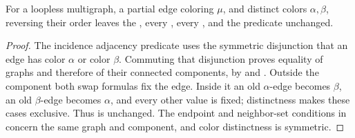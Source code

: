 \begin{lemma}
For a loopless multigraph, a partial edge coloring \(\mu\), and distinct
colors \(\alpha,\beta\), reversing their order leaves the
, every ,
every , and the
 predicate unchanged.
\end{lemma}
\begin{proof}
The incidence adjacency predicate uses the symmetric disjunction that
an edge has color \(\alpha\) or color \(\beta\). Commuting that
disjunction proves equality of graphs and therefore of their connected
components, by  and
. Outside the component both swap formulas
fix the edge. Inside it an old \(\alpha\)-edge becomes \(\beta\),
an old \(\beta\)-edge becomes \(\alpha\), and every other value
is fixed; distinctness makes these cases exclusive. Thus
 is unchanged. The endpoint and
neighbor-set conditions in  concern the
same graph and component, and color distinctness is symmetric.
\end{proof}
